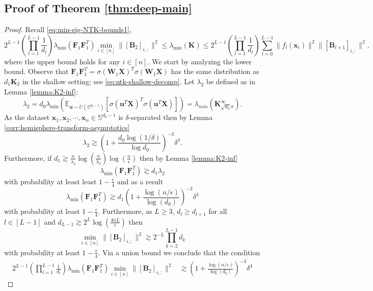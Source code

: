 \documentclass{article}
\theoremstyle{definition}
\newcommand{\E}{\mathbb{E}}
\renewcommand{\S}{\mathbb{S}}
\def\vu{{\bm{u}}}
\def\vx{{\bm{x}}}
\def\mB{{\bm{B}}}
\def\mF{{\bm{F}}}
\def\mK{{\bm{K}}}
\def\mW{{\bm{W}}}
\def\mX{{\bm{X}}}
\begin{document}
\subsection{Proof of Theorem \ref{thm:deep-main}} \label{app:thm-deep-main}

\ThmDeepMain*



\begin{proof}
    Recall \eqref{eq:min-eig-NTK-bounds1},
    \[
    2^{L-1}\left( \prod_{l = 1}^{L - 1}\frac{1}{d_l}\right) \lambda_{\min}\left( \mF_{1} \mF_{1}^T \right) \min_{i \in [n]} \|[\mB_2]_{i,:} \|^2 \leq \lambda_{\min}(\mK) \leq  2^{L-1}\left( \prod_{l = 1}^{L - 1}\frac{1}{d_l}\right) \sum_{l=0}^{L-1} \| f_l(\vx_i) \|^2 \| [\mB_{l+1}]_{i,:} \|^2,
    \]
    where the upper bound holds for any $i \in [n]$. We start by analyzing the lower bound. Observe that $ \mF_1\mF_1^T= \sigma(\mW_1 \mX)^T \sigma(\mW_1 \mX)$ has the same distribution as $d_1 \mK_2$ in the shallow setting; see \eqref{eq:ntk-shallow-decomp}. Let $\lambda_2$ be defined as in Lemma \ref{lemma:K2-inf}:
    \[
    \lambda_2 = d_0 \lambda_{\min} \left( \E_{\vu \sim U(\S^{d_0 -1})}\left[ \sigma(\vu^T\mX)^T\sigma(\vu^T\mX) \right]\right) = \lambda_{min}\left( \mK_{\sqrt{d_0} \sigma}^{\infty} \right).
    \]
    As the dataset $\vx_1, \vx_2, \cdots, \vx_n \in \S^{d_0 -1}$ is $\delta$-separated then by Lemma \ref{corr:hemisphere-transform-asymptotics}
    \[
    \lambda_2 \gtrsim  \left(1+ \frac{d_0\log(1/\delta) }{\log d_0}\right)^{-3}\delta^4.
    \]
    Furthermore, if $d_1 \gtrsim \tfrac{n}{\lambda_2} \log \left( \tfrac{n}{\lambda_2}\right) \log \left( \tfrac{n}{\epsilon}\right)$ then by Lemma \ref{lemma:K2-inf}
    \[
    \lambda_{\min}(\mF_1\mF_1^T) \gtrsim d_1 \lambda_2
    \]
    with probability at least least $1-\tfrac{\epsilon}{4}$ and as a result 
    \[
    \lambda_{\min}(\mF_1\mF_1^T) \gtrsim d_1 \left(1 + \frac{\log(n / \epsilon)}{\log(d_0)} \right)^{-3} \delta^4
    \]
    with probability at least $1- \tfrac{\epsilon}{4}$. Furthermore, as $L \geq 3$, $d_l \geq d_{l+1}$ for all $l \in [L - 1]$ and $d_{L-1} \gtrsim 2^L \log \left (\frac{4nL}{\epsilon}\right)$ then
    \[
    \min_{i \in [n]} \|[\mB_2]_{i,:} \|^2 \gtrsim 2^{-L} \prod_{k = 2}^{L-1} d_k
    \]
    with probability at least $1 - \tfrac{\epsilon}{4}$. Via a union bound we conclude that the condition
    \begin{align*}
      2^{L-1}\left( \prod_{l = 1}^{L - 1}\frac{1}{d_l}\right) \lambda_{\min}(\mF_1\mF_1^T)  \min_{i \in [n]} \|[\mB_2]_{i,:} \|^2 & \gtrsim \left(1 + \frac{\log(n / \epsilon)}{\log(d_0)} \right)^{-3} \delta^4

\end{align*}
\end{proof}
\end{document}

